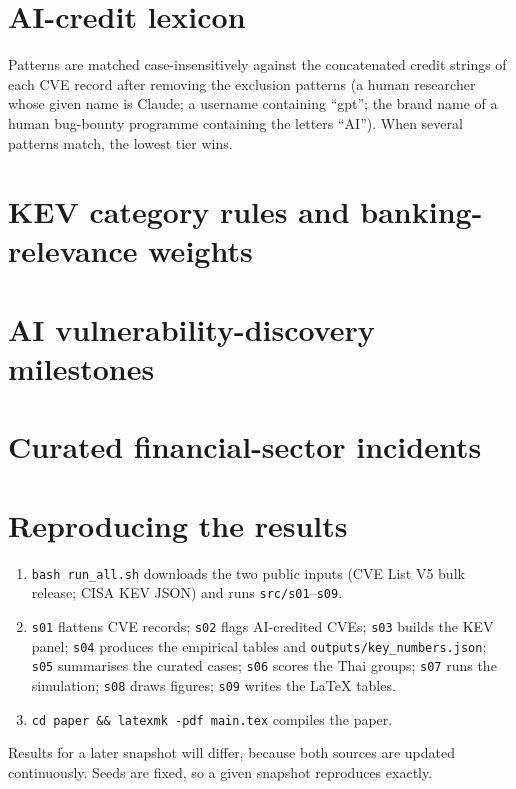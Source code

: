 \clearpage
\appendix
\section{AI-credit lexicon}\label{app:lexicon}
Patterns are matched case-insensitively against the concatenated credit strings of each CVE record after removing the exclusion patterns (a human researcher whose given name is Claude; a username containing ``gpt''; the brand name of a human bug-bounty programme containing the letters ``AI''). When several patterns match, the lowest tier wins.
{\small

}

\section{KEV category rules and banking-relevance weights}\label{app:rules}
{\small


}

\section{AI vulnerability-discovery milestones}\label{app:milestones}
\begin{table}[h]
\centering
\caption{Selected milestones (author-coded; verify dates and descriptions against the cited primary sources).}
\label{tab:milestones}
\scriptsize

\end{table}

\section{Curated financial-sector incidents}\label{app:incidents}
{\scriptsize

}

\section{Reproducing the results}\label{app:repro}
\begin{enumerate}[leftmargin=1.6em]
\item \texttt{bash run\_all.sh} downloads the two public inputs (CVE List V5 bulk release; CISA KEV JSON) and runs \texttt{src/s01}--\texttt{s09}.
\item \texttt{s01} flattens CVE records; \texttt{s02} flags AI-credited CVEs; \texttt{s03} builds the KEV panel; \texttt{s04} produces the empirical tables and \texttt{outputs/key\_numbers.json}; \texttt{s05} summarises the curated cases; \texttt{s06} scores the Thai groups; \texttt{s07} runs the simulation; \texttt{s08} draws figures; \texttt{s09} writes the LaTeX tables.
\item \texttt{cd paper \&\& latexmk -pdf main.tex} compiles the paper.
\end{enumerate}
Results for a later snapshot will differ, because both sources are updated continuously. Seeds are fixed, so a given snapshot reproduces exactly.
